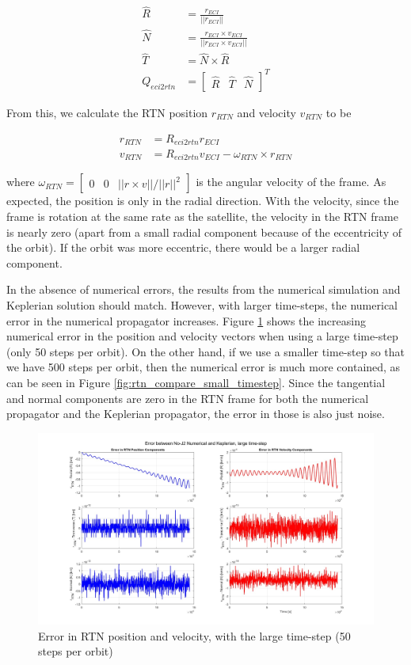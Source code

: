 \begin{align}
    \hat{R} &= \frac{r_{ECI}}{||r_{ECI}||} \\
    \hat{N} &= \frac{r_{ECI} \times v_{ECI}}{||r_{ECI} \times v_{ECI}||} \\
    \hat{T} &= \hat{N} \times \hat{R} \\
    Q_{eci2rtn} &= \begin{bmatrix}
        \hat{R} & \hat{T} & \hat{N}
    \end{bmatrix}^T 
\end{align}

From this, we calculate the RTN position $r_{RTN}$ and velocity $v_{RTN}$ to be

\begin{align}
    r_{RTN} &= R_{eci2rtn} r_{ECI} \\
    v_{RTN} &= R_{eci2rtn} v_{ECI} - \omega_{RTN} \times r_{RTN}
\end{align}

where $\omega_{RTN} = \begin{bmatrix}
    0 & 0 & ||r\times v ||/||r||^2
\end{bmatrix}$ is the angular velocity of the frame. As expected, the position is only in the radial direction. With the velocity, since the frame is rotation at the same rate as the satellite, the velocity in the RTN frame is nearly zero (apart from a small radial component because of the eccentricity of the orbit). If the orbit was more eccentric, there would be a larger radial component.

In the absence of numerical errors, the results from the numerical simulation and Keplerian solution should match. However, with larger time-steps, the numerical error in the numerical propagator increases. Figure \ref{fig:rtn_compare_large_timestep} shows the increasing numerical error in the position and velocity vectors when using a large time-step (only 50 steps per orbit). On the other hand, if we use a smaller time-step so that we have 500 steps per orbit, then the numerical error is much more contained, as can be seen in Figure \ref{fig:rtn_compare_small_timestep}. Since the tangential and normal components are zero in the RTN frame for both the numerical propagator and the Keplerian propagator, the error in those is also just noise.

\begin{figure}[H]
    \centering
    \includegraphics[width=0.75\linewidth]{PS1/Figures/comparing_rtn_large_timestep.jpg}
    \caption{Error in RTN position and velocity, with the large time-step (50 steps per orbit)}
    \label{fig:rtn_compare_large_timestep}
\end{figure}

